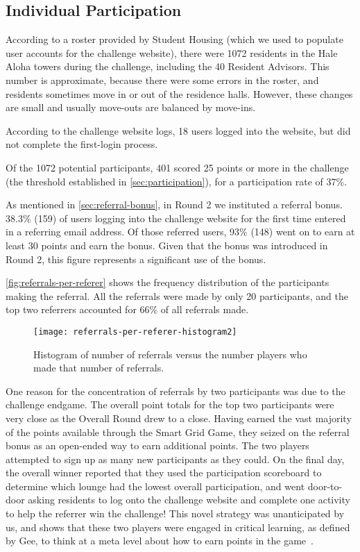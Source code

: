 \subsection{Individual Participation}
\label{sec:individual-participation}

According to a roster provided by Student Housing (which we used to populate user accounts for the challenge website), there were 1072 residents in the Hale Aloha towers during the challenge, including the 40 Resident Advisors. This number is approximate, because there were some errors in the roster, and residents sometimes move in or out of the residence halls. However, these changes are small and usually move-outs are balanced by move-ins.

According to the challenge website logs, 18 users logged into the website, but did not complete the first-login process.

Of the 1072 potential participants, 401 scored 25 points or more in the challenge (the threshold established in \autoref{sec:participation}), for a participation rate of 37\%.

As mentioned in \autoref{sec:referral-bonus}, in Round 2 we instituted a referral bonus. 38.3\% (159) of users logging into the challenge website for the first time entered in a referring email address. Of those referred users, 93\% (148) went on to earn at least 30 points and earn the bonus. Given that the bonus was introduced in Round 2, this figure represents a significant use of the bonus.

\autoref{fig:referrals-per-referer} shows the frequency distribution of the participants making the referral. All the referrals were made by only 20 participants, and the top two referrers accounted for 66\% of all referrals made.

\begin{figure}[htbp]
	\centering
	\texttt{[image: referrals-per-referer-histogram2]}
	\caption[Histogram of number of referrals versus the number players]{Histogram of number of referrals versus the number players who made that number of referrals.}
	\label{fig:referrals-per-referer}
\end{figure}

One reason for the concentration of referrals by two participants was due to the challenge endgame. The overall point totals for the top two participants were very close as the Overall Round drew to a close. Having earned the vast majority of the points available through the Smart Grid Game, they seized on the referral bonus as an open-ended way to earn additional points. The two players attempted to sign up as many new participants as they could. On the final day, the overall winner reported that they used the participation scoreboard to determine which lounge had the lowest overall participation, and went door-to-door asking residents to log onto the challenge website and complete one activity to help the referrer win the challenge! This novel strategy was unanticipated by us, and shows that these two players were engaged in critical learning, as defined by Gee, to think at a meta level about how to earn points in the game~\cite[p. 25]{Gee2007}.

